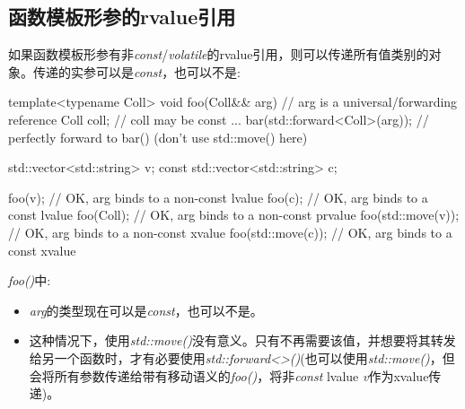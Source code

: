 \subsection{函数模板形参的rvalue引用}

如果函数模板形参有非\textit{const}/\textit{volatile}的rvalue引用，则可以传递所有值类别的对象。传递的实参可以是\textit{const}，也可以不是:

\begin{cppcode}
template<typename Coll>
void foo(Coll&& arg) // arg is a universal/forwarding reference
{
	Coll coll; // coll may be const
	...
	bar(std::forward<Coll>(arg)); // perfectly forward to bar() (don’t use std::move() here)
}

std::vector<std::string> v;
const std::vector<std::string> c;

foo(v); // OK, arg binds to a non-const lvalue
foo(c); // OK, arg binds to a const lvalue
foo(Coll{}); // OK, arg binds to a non-const prvalue
foo(std::move(v)); // OK, arg binds to a non-const xvalue
foo(std::move(c)); // OK, arg binds to a const xvalue
\end{cppcode}

\textit{foo()}中:

\begin{itemize}
	\item \textit{arg}的类型现在可以是\textit{const}，也可以不是。
	\item 这种情况下，使用\textit{std::move()}没有意义。只有不再需要该值，并想要将其转发给另一个函数时，才有必要使用\textit{std::forward<>()}(也可以使用\textit{std::move()}，但会将所有参数传递给带有移动语义的\textit{foo()}，将非\textit{const} lvalue \textit{v}作为xvalue传递)。
\end{itemize}












